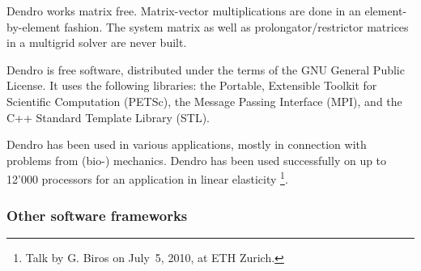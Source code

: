 \documentclass[11pt,pdftex]{article}
\begin{document}
\textsf{Dendro} works matrix free.  Matrix-vector multiplications are done in an
element-by-element fashion.  The system matrix as well as
prolongator/restrictor matrices in a multigrid solver are never built.

\textsf{Dendro} is free software, distributed under the terms of the GNU General
Public License.  It uses the following libraries: the Portable,
Extensible Toolkit for Scientific Computation (PETSc), the Message
Passing Interface (MPI), and the C++ Standard Template Library (STL).

\textsf{Dendro} has been used in various applications, mostly in connection with
problems from (bio-) mechanics.
\textsf{Dendro} has been used successfully on up to 12'000 processors
for an application in linear elasticity%
\footnote{Talk by G. Biros on July~5, 2010, at ETH Zurich.}.


\subsubsection{Other software frameworks}
\end{document}
